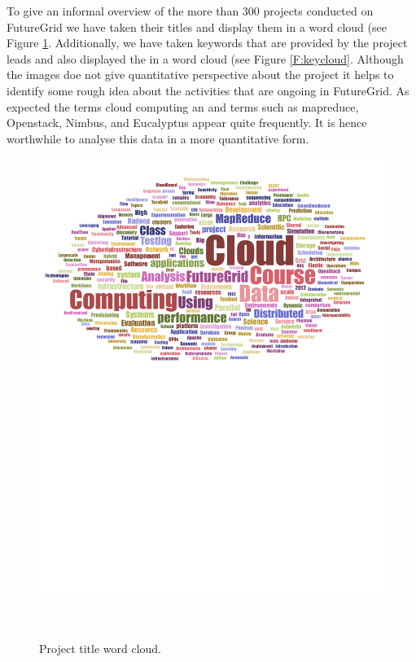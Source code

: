 \documentclass{article}
\begin{document}
To give an informal overview of the more than 300 projects conducted
on FutureGrid we have taken their titles and display them in a word
cloud (see Figure \ref{F:wordcloud}. Additionally, we have taken
keywords that are provided by the project leads and also displayed
the in a word cloud (see Figure \ref{F:keycloud}. Although the
images doe not give quantitative perspective about the project it helps
to identify some rough idea about the activities that are ongoing in FutureGrid.
As expected the terms cloud computing an and terms such as mapreduce,
Openstack, Nimbus, and Eucalyptus appear quite frequently. It is hence
worthwhile to analyse this data in a more quantitative form.

\begin{figure}[p]
\begin{minipage}[t]{1.0\textwidth}
  \centering
    \includegraphics[width=1.0\textwidth]{images/fg-title-wordcloud.pdf}
  \caption{Project title word cloud.}\label{F:wordcloud}
\end{minipage}
\vspace{24pt}\\

\end{figure}
\end{document}
